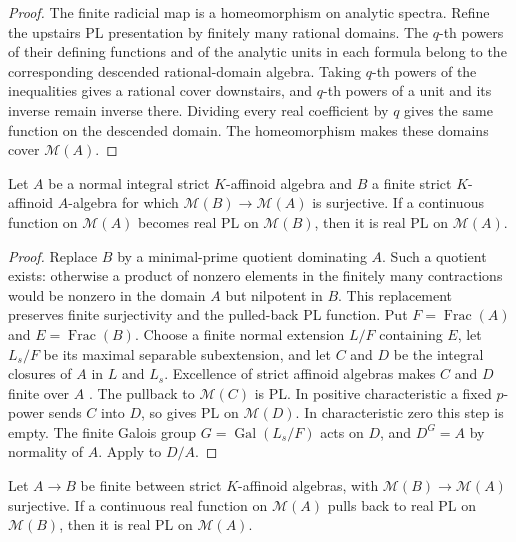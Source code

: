 \begin{proof}
The finite radicial map is a homeomorphism on analytic spectra. Refine the upstairs PL presentation by finitely many rational domains. The $q$-th powers of their defining functions and of the analytic units in each formula belong to the corresponding descended rational-domain algebra. Taking $q$-th powers of the inequalities gives a rational cover downstairs, and $q$-th powers of a unit and its inverse remain inverse there. Dividing every real coefficient by $q$ gives the same function on the descended domain. The homeomorphism makes these domains cover $\mathcal M(A)$.
\end{proof}

\begin{proposition}\label{prop:supplied-p061-normal-finite-descent}
Let $A$ be a normal integral strict $K$-affinoid algebra and $B$ a finite strict $K$-affinoid $A$-algebra for which $\mathcal M(B)\to\mathcal M(A)$ is surjective. If a continuous function on $\mathcal M(A)$ becomes real PL on $\mathcal M(B)$, then it is real PL on $\mathcal M(A)$.
\end{proposition}

\begin{proof}
Replace $B$ by a minimal-prime quotient dominating $A$. Such a quotient exists: otherwise a product of nonzero elements in the finitely many contractions would be nonzero in the domain $A$ but nilpotent in $B$. This replacement preserves finite surjectivity and the pulled-back PL function. Put $F=\operatorname{Frac}(A)$ and $E=\operatorname{Frac}(B)$. Choose a finite normal extension $L/F$ containing $E$, let $L_s/F$ be its maximal separable subextension, and let $C$ and $D$ be the integral closures of $A$ in $L$ and $L_s$. Excellence of strict affinoid algebras makes $C$ and $D$ finite over $A$ \cite[proof of Theorem~1.3.1]{Berkovich15Finiteness}. The pullback to $\mathcal M(C)$ is PL. In positive characteristic a fixed $p$-power sends $C$ into $D$, so  gives PL on $\mathcal M(D)$. In characteristic zero this step is empty. The finite Galois group $G=\operatorname{Gal}(L_s/F)$ acts on $D$, and $D^G=A$ by normality of $A$. Apply  to $D/A$.
\end{proof}

\begin{theorem}\label{thm:supplied-p061-finite-descent}
Let $A\to B$ be finite between strict $K$-affinoid algebras, with $\mathcal M(B)\to\mathcal M(A)$ surjective. If a continuous real function on $\mathcal M(A)$ pulls back to real PL on $\mathcal M(B)$, then it is real PL on $\mathcal M(A)$.
\end{theorem}

